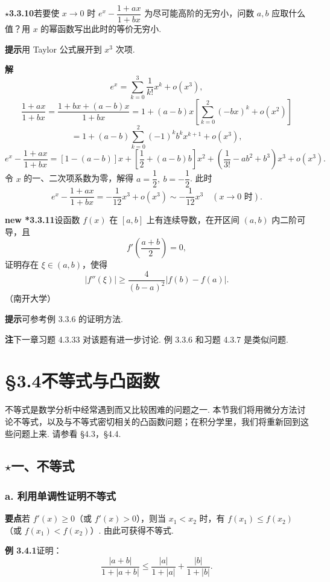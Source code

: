 \documentclass[UTF8,12pt,a4paper,fontset=fandol]{ctexart}
\begin{document}
\noindent\textbf{$\star$3.3.10}\quad 若要使 $x\to0$ 时 $e^x-\dfrac{1+ax}{1+bx}$ 为尽可能高阶的无穷小，问数 $a,b$ 应取什么值？用 $x$ 的幂函数写出此时的等价无穷小.

\noindent\textbf{提示}\quad 用 Taylor 公式展开到 $x^3$ 次项.

\noindent\textbf{解}\quad
\[
  e^x=\sum_{k=0}^3\frac1{k!}x^k+o(x^3),
\]
\[
  \frac{1+ax}{1+bx}=\frac{1+bx+(a-b)x}{1+bx}
  =1+(a-b)x\left[\sum_{k=0}^2(-bx)^k+o(x^2)\right]
\]
\[
  =1+(a-b)\sum_{k=0}^2(-1)^kb^kx^{k+1}+o(x^3),
\]
\[
  e^x-\frac{1+ax}{1+bx}
  =[1-(a-b)]x+\left[\frac12+(a-b)b\right]x^2
  +\left(\frac1{3!}-ab^2+b^3\right)x^3+o(x^3).
\]
令 $x$ 的一、二次项系数为零，解得 $a=\dfrac12,\ b=-\dfrac12$. 此时
\[
  e^x-\frac{1+ax}{1+bx}=-\frac1{12}x^3+o(x^3)\sim-\frac1{12}x^3\quad(x\to0\text{ 时}).
\]

\noindent\textbf{new *3.3.11}\quad 设函数 $f(x)$ 在 $[a,b]$ 上有连续导数，在开区间 $(a,b)$ 内二阶可导，且
\[
  f'\left(\frac{a+b}{2}\right)=0,
\]
证明存在 $\xi\in(a,b)$，使得
\[
  |f''(\xi)|\ge\frac4{(b-a)^2}|f(b)-f(a)|. \tag{1}
\]
（南开大学）

\noindent\textbf{提示}\quad 可参考例 3.3.6 的证明方法.

\noindent\textbf{注}\quad 下一章习题 4.3.33 对该题有进一步讨论. 例 3.3.6 和习题 4.3.7 是类似问题.

\section*{§3.4\quad 不等式与凸函数}

不等式是数学分析中经常遇到而又比较困难的问题之一. 本节我们将用微分方法讨论不等式，以及与不等式密切相关的凸函数问题；在积分学里，我们将重新回到这些问题上来. 请参看 §4.3，§4.4.

\subsection*{$\star$一、不等式}

\subsubsection*{a. 利用单调性证明不等式}

\noindent\textbf{要点}\quad 若 $f'(x)\ge0$（或 $f'(x)>0$），则当 $x_1<x_2$ 时，有 $f(x_1)\le f(x_2)$（或 $f(x_1)<f(x_2)$）. 由此可获得不等式.

\noindent\textbf{例 3.4.1}\quad 证明：
\[
  \frac{|a+b|}{1+|a+b|}\le \frac{|a|}{1+|a|}+\frac{|b|}{1+|b|}.
\]
\end{document}
